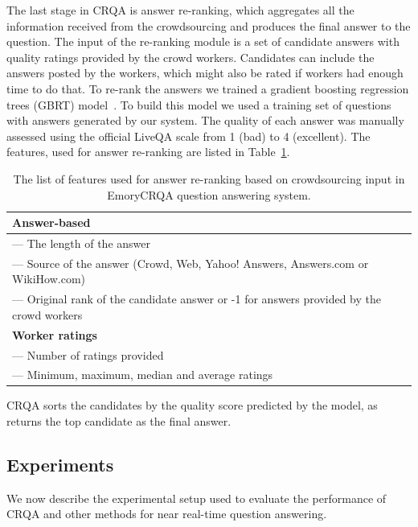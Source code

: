 The last stage in CRQA is answer re-ranking, which aggregates all the information received from the crowdsourcing and produces the final answer to the question.
The input of the re-ranking module is a set of candidate answers with quality ratings provided by the crowd workers.
Candidates can include the answers posted by the workers, which might also be rated if workers had enough time to do that.
To re-rank the answers we trained a gradient boosting regression trees (GBRT) model~\cite{friedman2002stochastic}.
To build this model we used a training set of questions with answers generated by our system.
The quality of each answer was manually assessed using the official LiveQA scale from 1 (bad) to 4 (excellent).
The features, used for answer re-ranking are listed in Table~\ref{table:non-factoid:crowdsourcing:crqa:reranking_features}.

\begin{table}[ht]
\centering
\begin{tabular}{p{13cm}}
\textbf{Answer-based} \\
\hline
--- The length of the answer \\
--- Source of the answer (Crowd, Web, Yahoo! Answers, Answers.com or WikiHow.com)\\
--- Original rank of the candidate answer or -1 for answers provided by the crowd workers\\
\hline
\textbf{Worker ratings} \\
\hline
--- Number of ratings provided\\
--- Minimum, maximum, median and average ratings\\
\end{tabular}
\caption{The list of features used for answer re-ranking based on crowdsourcing input in EmoryCRQA question answering system.}
\label{table:non-factoid:crowdsourcing:crqa:reranking_features}
\end{table}

CRQA sorts the candidates by the quality score predicted by the model, as returns the top candidate as the final answer.


\subsection{Experiments}
\label{section:non-factoid:crowdsourcing:experiments}

We now describe the experimental setup used to evaluate the performance of CRQA and other methods for near real-time question answering.

